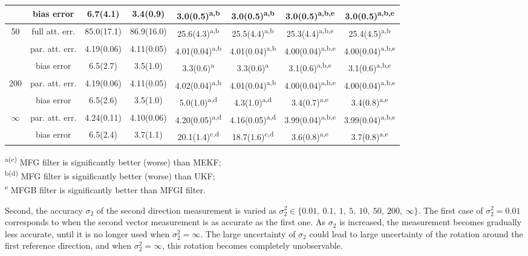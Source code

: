 \begin{table}
\begin{tabular}{c|c|cccccc}
		& bias error & 6.7(4.1) & 3.4(0.9) & 3.0(0.5)\textsuperscript{a,b} & 3.0(0.5)\textsuperscript{a,b} & 3.0(0.5)\textsuperscript{a,b,e} & 3.0(0.5)\textsuperscript{a,b,e} \\ \hline
		\multirow{3}{*}{50} & full att. err. & 85.0(17.1) & 86.9(16.0) & 25.6(4.3)\textsuperscript{a,b} & 25.5(4.4)\textsuperscript{a,b} & 25.3(4.4)\textsuperscript{a,b,e} & 25.4(4.5)\textsuperscript{a,b} \\
		& par. att. err. & 4.19(0.06) & 4.11(0.05) & 4.01(0.04)\textsuperscript{a,b} & 4.01(0.04)\textsuperscript{a,b} & 4.00(0.04)\textsuperscript{a,b,e} & 4.00(0.04)\textsuperscript{a,b,e} \\
		& bias error & 6.5(2.7) & 3.5(1.0) & 3.3(0.6)\textsuperscript{a} & 3.3(0.6)\textsuperscript{a} & 3.1(0.6)\textsuperscript{a,b,e} & 3.1(0.6)\textsuperscript{a,b,e} \\ \hline
		\multirow{2}{*}{200} & par. att. err. & 4.19(0.06) & 4.11(0.05) & 4.02(0.04)\textsuperscript{a,b} & 4.01(0.04)\textsuperscript{a,b} & 4.00(0.04)\textsuperscript{a,b,e} & 4.00(0.04)\textsuperscript{a,b,e} \\
		& bias error & 6.5(2.6) & 3.5(1.0) & 5.0(1.0)\textsuperscript{a,d} & 4.3(1.0)\textsuperscript{a,d} & 3.4(0.7)\textsuperscript{a,e} & 3.4(0.8)\textsuperscript{a,e} \\ \hline
		\multirow{2}{*}{$\infty$} & par. att. err. & 4.24(0.11) & 4.10(0.06) & 4.20(0.05)\textsuperscript{a,d} & 4.16(0.05)\textsuperscript{a,d} & 3.99(0.04)\textsuperscript{a,b,e} & 3.99(0.04)\textsuperscript{a,b,e} \\
		& bias error & 6.5(2.4) & 3.7(1.1) & 20.1(1.4)\textsuperscript{c,d} & 18.7(1.6)\textsuperscript{c,d} & 3.6(0.8)\textsuperscript{a,e} & 3.7(0.8)\textsuperscript{a,e} \\ \bottomrule
	\end{tabular}
	
	\vspace{0.1cm}
	\raggedright
	\textsuperscript{a(c)} MFG filter is significantly better (worse) than MEKF; \\
	\textsuperscript{b(d)} MFG filter is significantly better (worse) than UKF; \\
	\textsuperscript{e} MFGB filter is significantly better than MFGI filter.
\end{table}

Second, the accuracy $\sigma_2$ of the second direction measurement is varied as $\sigma_2^2 \in \{0.01,\allowbreak\ 0.1,\allowbreak\ 1,\allowbreak\ 5,\allowbreak\ 10,\allowbreak\ 50,\allowbreak\ 200,\allowbreak\ \infty\}$.
The first case of $\sigma_2^2=0.01$ corresponds to when the second vector measurement is as accurate as the first one.
As $\sigma_2$ is increased, the measurement becomes gradually less accurate, until it is no longer used when $\sigma_2^2 = \infty$.
The large uncertainty of $\sigma_2$ could lead to large uncertainty of the rotation around the first reference direction, and when $\sigma_2^2 = \infty$, this rotation becomes completely unobservable.

